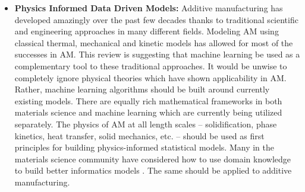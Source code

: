 \begin{itemize}
	\item \textbf{Physics Informed Data Driven Models:} Additive manufacturing has developed amazingly over the past few decades thanks to traditional scientific and engineering approaches in many different fields. Modeling AM using classical thermal, mechanical and kinetic models has allowed for most of the successes in AM. This review is suggesting that machine learning be used as a complementary tool to these traditional approaches. It would be unwise to completely ignore physical theories which have shown applicability in AM. Rather, machine learning algorithms should be built around currently existing models. There are equally rich mathematical frameworks in both materials science and machine learning which are currently being utilized separately. The physics of AM at all length scales -- solidification, phase kinetics, heat transfer, solid mechanics, etc. -- should be used as first principles for building physics-informed statistical models. Many in the materials science community have considered how to use domain knowledge to build better informatics models \cite{Deaven1995, Morris1996, Wagner2016, Raccuglia2016}. The same should be applied to additive manufacturing.
\end{itemize}